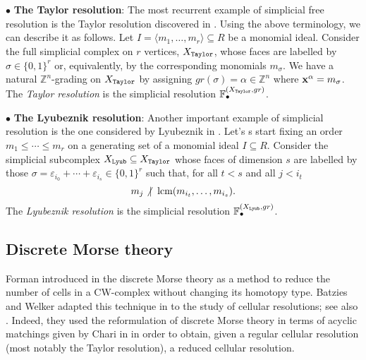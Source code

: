 \documentclass[12pt]{amsart}
\theoremstyle{definition}
\theoremstyle{remark}
\numberwithin{equation}{section}
\newcommand{\bZ}{{\mathbb{Z}}}
\newcommand{\phil}[1]{{\color{red} \sf $\star\star$ Philippe: [#1]}}
\begin{document}
\vskip 2mm

$\bullet$ {\bf The Taylor resolution}:  The most recurrent example of simplicial free resolution is the Taylor resolution
discovered in \cite{Tay66}. Using the above terminology, we can describe it as follows.
%
%
Let $I=\langle m_1,\dots, m_r \rangle \subseteq R$ be a monomial ideal.
Consider the full simplicial complex on $r$ vertices, $X_{\tt Taylor}$, whose faces are labelled by
$\sigma \in \{0,1\}^r$ or, equivalently, by the corresponding monomials $m_\sigma$. We have a natural
$\bZ^n$-grading on $X_{\tt Taylor}$ by assigning $gr(\sigma)=\alpha \in \bZ^n$ where ${\bf x}^\alpha=m_\sigma$.
The {\it Taylor resolution} is the simplicial resolution $\mathbb{F}_{\bullet}^{(X_{\tt Taylor}, gr)}$.

\vskip 2mm
%
%
$\bullet$ {\bf The Lyubeznik resolution}:  Another important example of simplicial resolution is the one considered by Lyubeznik
in \cite{Lyu88}. Let's s start fixing an order $m_1 \leq \cdots \leq m_r$ on a generating set of a monomial ideal $I\subseteq R$.
Consider the simplicial subcomplex $X_{\tt Lyub} \subseteq X_{\tt Taylor}$ whose faces of dimension $s$ are labelled by
those $\sigma=\varepsilon_{i_0}+ \cdots + \varepsilon_{i_s} \in \{0,1\}^r$
such that, for all $t<s$ %
and all $j <i_t$ %
$$ m_j \not | \hskip 2mm {\rm lcm}(m_{i_t},\dots , m_{i_s}).$$
The {\it Lyubeznik resolution} is the simplicial resolution $\mathbb{F}_{\bullet}^{(X_{\tt Lyub}, gr)}$.

\vskip 2mm



\subsection{Discrete Morse theory}
Forman introduced in  \cite{For} the discrete Morse theory as a method to
reduce the number of cells in a CW-complex without changing its
homotopy type. Batzies and Welker adapted this technique in \cite{BW}
to the study of cellular resolutions; see also \cite{Wel07}.  Indeed, they used the
reformulation of discrete Morse theory in terms of acyclic matchings
given by Chari in \cite{CH} in order to obtain, given a  regular  cellular
resolution (most notably the Taylor resolution), a reduced
 cellular resolution.


\vskip 2mm
\end{document}
